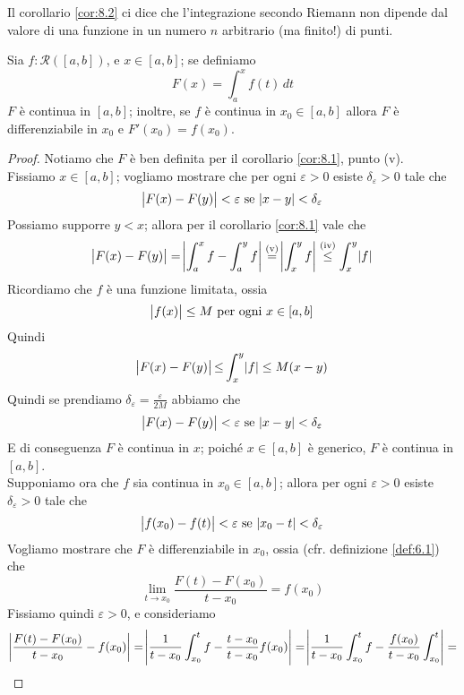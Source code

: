 \begin{remark}
    Il corollario \ref{cor:8.2} ci dice che l'integrazione secondo Riemann non dipende dal valore di una funzione in un numero $n$ arbitrario (ma finito!) di punti.
\end{remark}
\begin{theorem}
    \label{th:8.2}
    Sia $f\colon\mathscr{R}([a,b])$, e $x\in[a,b]$; se definiamo
    \begin{equation}
        \label{eq:8.6}
        F(x) = \int_a^xf(t)\, dt
    \end{equation}
    $F$ è continua in $[a,b]$; inoltre, se $f$ è continua in $x_0\in[a,b]$ allora $F$ è differenziabile in $x_0$ e $F'(x_0) = f(x_0)$.
\end{theorem}
\begin{proof}
    Notiamo che $F$ è ben definita per il corollario \ref{cor:8.1}, punto (v).\\
    Fissiamo $x\in[a,b]$; vogliamo mostrare che per ogni $\varepsilon>0$ esiste $\delta_\varepsilon>0$ tale che
    \[
    \abs{F(x)-F(y)}<\varepsilon \ \text{se} \ \abs{x-y}<\delta_\varepsilon
    \]
    Possiamo supporre $y<x$; allora per il corollario \ref{cor:8.1} vale che
    \[
    \abs{F(x)-F(y)} = \abs{\int_a^x f - \int_a^y f} \overset{\text{(v)}}{=} \abs{\int_x^y f} \overset{\text{(iv)}}{\le }\int_x^y \abs{f}
    \]
    Ricordiamo che $f$ è una funzione limitata, ossia
    \[
    \abs{f(x)} \le M \ \text{per ogni} \ x\in[a,b]
    \]
    Quindi
    \[
    \abs{F(x)-F(y)} {\le }\int_x^y \abs{f} \le M (x-y)
    \]
    Quindi se prendiamo $\delta_\varepsilon = \frac{\varepsilon}{2M}$ abbiamo che
    \[
    \abs{F(x)-F(y)}<\varepsilon \ \text{se} \ \abs{x-y}<\delta_\varepsilon
    \]
    E di conseguenza $F$ è continua in $x$; poiché $x\in[a,b]$ è generico, $F$ è continua in $[a,b]$.\\
    Supponiamo ora che $f$ sia continua in $x_0\in[a,b]$; allora per ogni $\varepsilon>0$ esiste $\delta_\varepsilon>0$ tale che
    \begin{equation}
        \label{eq:8.7}
        \abs{f(x_0)-f(t)}<\varepsilon \ \text{se} \ \abs{x_0-t}<\delta_\varepsilon
    \end{equation}
    Vogliamo mostrare che $F$ è differenziabile in $x_0$, ossia (cfr. definizione \ref{def:6.1}) che 
    \[
    \lim_{t\to x_0} \frac{F(t)-F(x_0)}{t-x_0} = f(x_0)
    \]
    Fissiamo quindi $\varepsilon>0$, e consideriamo
    \[
    \begin{split}
        & \abs{\frac{F(t)-F(x_0)}{t-x_0}-f(x_0)} = \abs{\frac{1}{t-x_0}\int_{x_0}^tf -\frac{t-x_0}{t-x_0}f(x_0)} = \abs{\frac{1}{t-x_0} \int_{x_0}^t f - \frac{f(x_0)}{t-x_0}\int_{x_0}^t} = \\

\end{split}\]
\end{proof}
